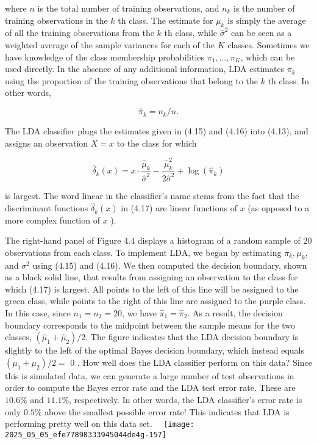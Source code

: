 \documentclass[10pt]{article}
\begin{document}
where $n$ is the total number of training observations, and $n_{k}$ is the number of training observations in the $k$ th class. The estimate for $\mu_{k}$ is simply the average of all the training observations from the $k$ th class, while $\hat{\sigma}^{2}$ can be seen as a weighted average of the sample variances for each of the $K$ classes. Sometimes we have knowledge of the class membership probabilities $\pi_{1}, \ldots, \pi_{K}$, which can be used directly. In the absence of any additional information, LDA estimates $\pi_{k}$ using the proportion of the training observations that belong to the $k$ th class. In other words,


\begin{equation*}
\hat{\pi}_{k}=n_{k} / n . \tag{4.16}
\end{equation*}


The LDA classifier plugs the estimates given in (4.15) and (4.16) into (4.13), and assigns an observation $X=x$ to the class for which


\begin{equation*}
\hat{\delta}_{k}(x)=x \cdot \frac{\hat{\mu}_{k}}{\hat{\sigma}^{2}}-\frac{\hat{\mu}_{k}^{2}}{2 \hat{\sigma}^{2}}+\log \left(\hat{\pi}_{k}\right) \tag{4.17}
\end{equation*}


is largest. The word linear in the classifier's name stems from the fact that the discriminant functions $\hat{\delta}_{k}(x)$ in (4.17) are linear functions of $x$ (as opposed to a more complex function of $x$ ).

The right-hand panel of Figure 4.4 displays a histogram of a random sample of 20 observations from each class. To implement LDA, we began by estimating $\pi_{k}, \mu_{k}$, and $\sigma^{2}$ using (4.15) and (4.16). We then computed the decision boundary, shown as a black solid line, that results from assigning an observation to the class for which (4.17) is largest. All points to the left of this line will be assigned to the green class, while points to the right of this line are assigned to the purple class. In this case, since $n_{1}=n_{2}=20$, we have $\hat{\pi}_{1}=\hat{\pi}_{2}$. As a result, the decision boundary corresponds to the midpoint between the sample means for the two classes, $\left(\hat{\mu}_{1}+\hat{\mu}_{2}\right) / 2$. The figure indicates that the LDA decision boundary is slightly to the left of the optimal Bayes decision boundary, which instead equals $\left(\mu_{1}+\mu_{2}\right) / 2=$ 0 . How well does the LDA classifier perform on this data? Since this is simulated data, we can generate a large number of test observations in order to compute the Bayes error rate and the LDA test error rate. These are $10.6 \%$ and $11.1 \%$, respectively. In other words, the LDA classifier's error rate is only $0.5 \%$ above the smallest possible error rate! This indicates that LDA is performing pretty well on this data set.\
\
\texttt{[image: 2025\_05\_05\_efe77898333945044de4g-157]}
\end{document}
